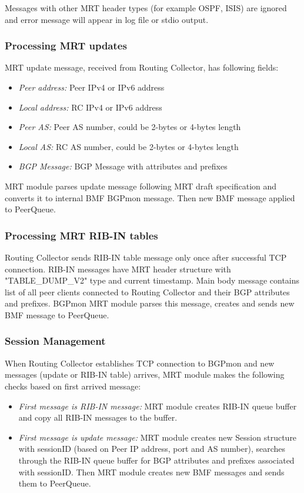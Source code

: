 Messages with other MRT header types (for example OSPF, ISIS) are ignored and error message will appear in log file or stdio output.



\subsubsection{Processing MRT updates}
MRT update message, received from Routing Collector, has following fields:
\begin{itemize}
\item{\emph {Peer address:} Peer IPv4 or IPv6 address}
\item{\emph {Local address:} RC IPv4 or IPv6 address}
\item{\emph {Peer AS:} Peer AS number, could be 2-bytes or 4-bytes length}
\item{\emph {Local AS:} RC AS number, could be 2-bytes or 4-bytes length}
\item{\emph {BGP Message:} BGP Message with attributes and prefixes}
\end{itemize}
MRT module parses update message following MRT draft specification and converts it to internal BMF BGPmon message. Then new BMF message applied to PeerQueue.

\subsubsection{Processing MRT RIB-IN tables}
Routing Collector sends RIB-IN table message only once after successful TCP connection. RIB-IN messages have MRT header structure with "TABLE\_DUMP\_V2" type and current timestamp. Main body message contains list of all peer clients connected to Routing Collector and their BGP attributes and prefixes. BGPmon MRT module parses this message, creates and sends new BMF message to PeerQueue.

\subsubsection{Session Management}
\label{sec:mrt:sessionmanagement}
When Routing Collector establishes TCP connection to BGPmon and new messages (update or RIB-IN table) arrives, MRT module makes the following checks based on first arrived message:
\begin{itemize}
\item{\emph{First message is RIB-IN message:} MRT module creates RIB-IN queue buffer and copy all RIB-IN messages to the buffer.}
\item{\emph{First message is update message:} MRT module creates new Session structure with sessionID (based on Peer IP address, port and AS number), searches through the RIB-IN queue buffer for BGP attributes and prefixes associated with sessionID. Then MRT module creates new BMF messages and sends them to PeerQueue. }
\end{itemize}

